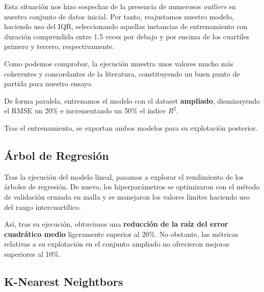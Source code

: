 
Esta situación nos hizo sospechar de la presencia de numerosos \textit{outliers} en nuestro conjunto de datos inicial. Por tanto, reajustamos nuestro modelo, haciendo uso del IQR\cite{Bonthu2021DetectingOutliers}, seleccionando aquellas instancias de entrenamiento con duración comprendida entre 1.5 veces por debajo y por encima de los cuartiles primero y tercero, respectivamente.

Como podemos comprobar, la ejecución muestra unos valores mucho más coherentes y concordantes de la literatura, constituyendo un buen punto de partida para nuestro ensayo.


De forma paralela, entrenamos el modelo con el dataset \textbf{ampliado}, disminuyendo el RMSE un 20\% e incrementando un 50\% el índice $R^{2}$.

Tras el entrenamiento, se exportan ambos modelos para su explotación posterior.


\subsection{Árbol de Regresión}

Tras la ejecución del modelo lineal, pasamos a explorar el rendimiento de los árboles de regresión.
De nuevo, los hiperparámetros se optimizaron con el método de validación cruzada en malla y se manejaron los valores límites haciendo uso del rango intercuartílico.

Así, tras su ejecución, obtuvimos una \textbf{reducción de la raíz del error cuadrático medio} ligeramente superior al 20\%. No obstante, las métricas relativas a su explotación en el conjunto ampliado no ofrecieron mejoras superiores al 10\%.



\subsection{K-Nearest Neightbors}

